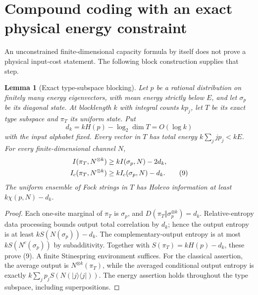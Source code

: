 \documentclass[11pt]{article}
\newtheorem{lemma}[theorem]{Lemma}
\begin{document}
\section{Compound coding with an exact physical energy constraint}
An unconstrained finite-dimensional capacity formula by itself does not
prove a physical input-cost statement. The following block construction
supplies that step.

\begin{lemma}[Exact type-subspace blocking]\label{lem:type}
Let \(p\) be a rational distribution on finitely many energy eigenvectors,
with mean energy strictly below \(E\), and let \(\sigma_p\) be its diagonal
state. At blocklength \(k\) with integral counts \(kp_j\), let \(T\)
be its exact type subspace and \(\pi_T\) its uniform state. Put
\[
 d_k=kH(p)-\log_2\dim T=O(\log k)
\]
with the input alphabet fixed. Every vector in \(T\) has total energy
\(k\sum_jjp_j<kE\). For every finite-dimensional channel \(N\),
\begin{align}
 I(\pi_T,N^{\otimes k})&\ge kI(\sigma_p,N)-2d_k,\notag\\
 I_c(\pi_T,N^{\otimes k})&\ge kI_c(\sigma_p,N)-d_k.              \tag{9}
\end{align}
The uniform ensemble of Fock strings in \(T\) has Holevo information
at least \(k\chi(p,N)-d_k\).
\end{lemma}
\begin{proof}
Each one-site marginal of \(\pi_T\) is \(\sigma_p\), and
\(D(\pi_T\Vert\sigma_p^{\otimes k})=d_k\).
Relative-entropy data processing bounds output total correlation by
\(d_k\); hence the output entropy is at least
\(kS(N(\sigma_p))-d_k\).
The complementary-output entropy is at most
\(kS(N^c(\sigma_p))\) by subadditivity.
Together with \(S(\pi_T)=kH(p)-d_k\), these prove (9).
A finite Stinespring environment suffices.
For the classical assertion, the average output is \(N^{\otimes k}(\pi_T)\),
while the averaged conditional output entropy is exactly
\(k\sum_jp_jS(N(|j\rangle\langle j|))\).
The energy assertion holds throughout the type subspace, including
superpositions.
\end{proof}
\end{document}
